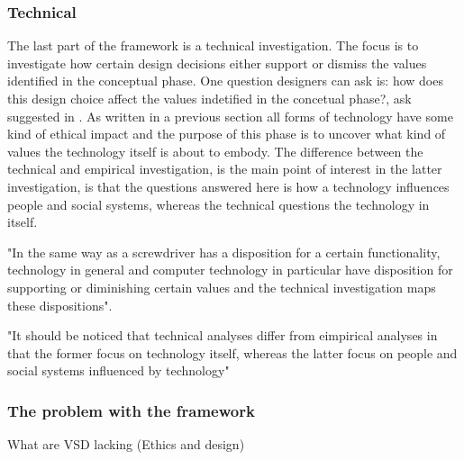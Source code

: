 \subsubsection{Technical}
The last  part of the framework is a technical investigation. The focus is to investigate how certain design decisions either support or dismiss the values identified in the conceptual phase. One question designers can ask is: how does this design choice affect the values indetified in the concetual phase?, ask suggested in . As written in a previous section all forms of technology have some kind of ethical impact and the purpose of this phase is to uncover what kind of values the technology itself is about to embody.
The difference between the technical and empirical investigation, is the main point of interest in the latter investigation, is that the questions answered here is how a technology influences people and social systems, whereas the technical questions the technology in itself. 

"In the same way as a screwdriver has a disposition for a certain functionality, technology in general and computer technology in particular have disposition for supporting or diminishing certain values and the technical investigation maps these dispositions". 

"It should be noticed that technical analyses differ from eimpirical analyses in that the former focus on technology itself, whereas the latter focus on people and social systems influenced by technology"


\subsubsection{The problem with the framework}
What are VSD lacking (Ethics and design)
